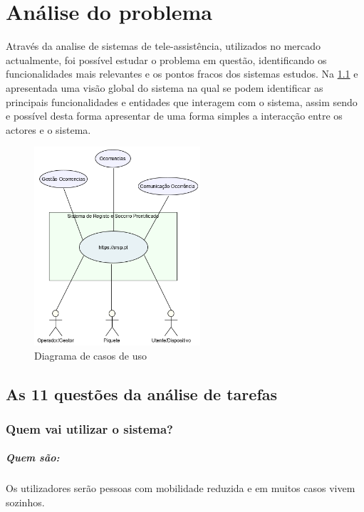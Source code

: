 \chapter{Análise do problema}
\label{cap2}

Através da analise de sistemas de tele-assistência, utilizados no mercado actualmente, foi possível estudar o problema em questão, identificando os funcionalidades mais relevantes e os pontos fracos dos sistemas estudos. Na \ref{fig:cenario_global} e apresentada uma visão global do sistema na qual se podem identificar as principais funcionalidades e entidades que interagem com o sistema, assim sendo e possível desta forma apresentar de uma forma simples a interacção entre os actores e o sistema.

\begin{figure}[!htb]
	\centering
	\includegraphics[width=0.55\textwidth]{figuras/cenario_global_sistema.png}
	\caption{Diagrama de casos de uso}
	\label{fig:cenario_global}
\end{figure}

\section{As 11 questões da análise de tarefas}

\subsection{Quem vai utilizar o sistema?}
\paragraph{Quem são:}Os utilizadores serão pessoas com mobilidade reduzida e em muitos casos vivem sozinhos.

